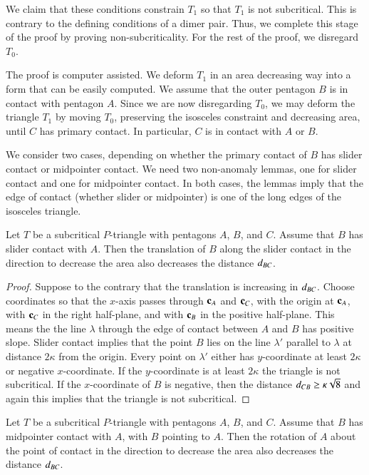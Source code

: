 We claim that these conditions constrain $T_1$ so that $T_1$ is not
subcritical.  This is contrary to the defining conditions of a dimer
pair.  Thus, we complete this stage of the proof by proving
non-subcriticality. For the rest of the proof, we disregard $T_0$.

The proof is computer assisted.  We deform $T_1$ in an area decreasing
way into a form that can be easily computed.  We assume that the outer
pentagon $B$ is in contact with pentagon $A$.  Since we are now
disregarding $T_0$, we may deform the triangle $T_1$ by moving $T_0$,
preserving the isosceles constraint and decreasing area, until $C$ has
primary contact.  In particular, $C$ is in contact with $A$ or $B$.

We consider two cases, depending on whether the primary contact of $B$
has slider contact or midpointer contact.  We need two non-anomaly
lemmas, one for slider contact and one for midpointer contact.  In
both cases, the lemmas imply that the edge of contact (whether slider
or midpointer) is one of the long edges of the isosceles triangle.

\begin{lemma}  
  Let $T$ be a subcritical $P$-triangle with pentagons $A$, $B$, and
  $C$.  Assume that $B$ has slider contact with $A$.  Then the
  translation of $B$ along the slider contact in the direction to
  decrease the area also decreases the distance $d_{BC}$.
\end{lemma}

\begin{proof} 
  Suppose to the contrary that the translation is increasing in
  $d_{BC}$.  Choose coordinates so that the $x$-axis passes through
  ${\mathbf c}_A$ and ${\mathbf c}_C$, with the origin at ${\mathbf c}_A$, with ${\mathbf c}_C$ in the
  right half-plane, and with ${\mathbf c}_B$ in the positive half-plane.  This
  means the the line $\lambda$ through the edge of contact between $A$
  and $B$ has positive slope.  Slider contact implies that the point
  $B$ lies on the line $\lambda'$ parallel to $\lambda$ at distance
  $2\kappa$ from the origin.  Every point on $\lambda'$ either has
  $y$-coordinate at least $2\kappa$ or negative $x$-coordinate.  If
  the $y$-coordinate is at least $2\kappa$ the triangle is not
  subcritical.  If the $x$-coordinate of $B$ is negative, then the
  distance $d_{CB} \ge\kappa\sqrt8$ and again this implies that the
  triangle is not subcritical.
\end{proof}

\begin{lemma}  
  Let $T$ be a subcritical $P$-triangle with pentagons $A$, $B$, and
  $C$.  Assume that $B$ has midpointer contact with $A$, with $B$
  pointing to $A$.  Then the rotation of $A$ about the point of
  contact in the direction to decrease the area also decreases the
  distance $d_{BC}$.
\end{lemma}

